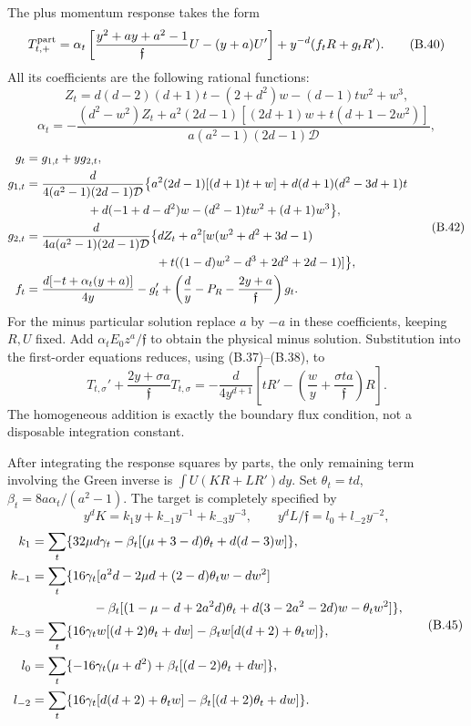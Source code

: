 \documentclass[a4paper,11pt]{article}
\numberwithin{equation}{section}
\begin{document}
The plus momentum response takes the form \[
T^{\rm part}_{t,+}
=\alpha_t\left[
\frac{y^2+ay+a^2-1}{\mathfrak f}U-(y+a)U'\right]
+y^{-d}(f_tR+g_tR').
\tag{B.40}
\] All its coefficients are the following rational functions: \[
Z_t=d(d-2)(d+1)t-(2+d^2)w-(d-1)tw^2+w^3,
\] \[
\alpha_t=
-\frac{(d^2-w^2)Z_t
+a^2(2d-1)[(2d+1)w+t(d+1-2w^2)]}
{a(a^2-1)(2d-1)\mathcal D},
\tag{B.41}
\] \[
\begin{aligned}
g_t&=g_{1,t}+yg_{2,t},\\
g_{1,t}&=\frac{d}{4(a^2-1)(2d-1)\mathcal D}
\bigl\{a^2(2d-1)[(d+1)t+w]
+d(d+1)(d^2-3d+1)t\\
&\hspace{18mm}+d(-1+d-d^2)w-(d^2-1)tw^2+(d+1)w^3\bigr\},\\
g_{2,t}&=\frac{d}{4a(a^2-1)(2d-1)\mathcal D}
\bigl\{dZ_t+a^2[w(w^2+d^2+3d-1)\\
&\hspace{38mm}+t((1-d)w^2-d^3+2d^2+2d-1)]\bigr\},\\
f_t&=\frac{d[-t+\alpha_t(y+a)]}{4y}
-g_t'+\left(\frac d y-P_R-\frac{2y+a}{\mathfrak f}\right)g_t.
\end{aligned}
\tag{B.42}
\] For the minus particular solution replace \(a\) by \(-a\) in these coefficients, keeping \(R,U\) fixed. Add \(\alpha_tE_0z^a/\mathfrak f\) to obtain the physical minus solution. Substitution into the first-order equations reduces, using (B.37)--(B.38), to \[
T_{t,\sigma}'+\frac{2y+\sigma a}{\mathfrak f}T_{t,\sigma}
=-\frac{d}{4y^{d+1}}
\left[tR'-\left(\frac wy+\frac{\sigma ta}{\mathfrak f}\right)R\right].
\tag{B.43}
\] The homogeneous addition is exactly the boundary flux condition, not a disposable integration constant.

After integrating the response squares by parts, the only remaining term involving the Green inverse is \(\int U(KR+LR')dy\). Set \(\theta_t=td\), \(\beta_t=8a\alpha_t/(a^2-1)\). The target is completely specified by \[
y^dK=k_1y+k_{-1}y^{-1}+k_{-3}y^{-3},\qquad
y^dL/\mathfrak f=l_0+l_{-2}y^{-2},
\tag{B.44}
\] \[
\begin{aligned}
k_1&=\sum_t\{32\mu d\gamma_t
-\beta_t[(\mu+3-d)\theta_t+d(d-3)w]\},\\
k_{-1}&=\sum_t\{16\gamma_t[a^2d-2\mu d+(2-d)\theta_tw-dw^2]\\
&\hspace{17mm}-\beta_t[(1-\mu-d+2a^2d)\theta_t
+d(3-2a^2-2d)w-\theta_tw^2]\},\\
k_{-3}&=\sum_t\{16\gamma_tw[(d+2)\theta_t+dw]
-\beta_tw[d(d+2)+\theta_tw]\},\\
l_0&=\sum_t\{-16\gamma_t(\mu+d^2)
+\beta_t[(d-2)\theta_t+dw]\},\\
l_{-2}&=\sum_t\{16\gamma_t[d(d+2)+\theta_tw]
-\beta_t[(d+2)\theta_t+dw]\}.
\end{aligned}
\tag{B.45}
\]
\end{document}
